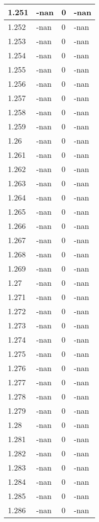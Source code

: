 \documentclass[a4paper,14pt]{extarticle}
\begin{document}
\begin{longtable}{||m{3cm}||m{3cm}|m{3cm}||m{3cm}||}
\hline
1.251 & -nan & 0 & -nan\\
\hline
1.252 & -nan & 0 & -nan\\
\hline
1.253 & -nan & 0 & -nan\\
\hline
1.254 & -nan & 0 & -nan\\
\hline
1.255 & -nan & 0 & -nan\\
\hline
1.256 & -nan & 0 & -nan\\
\hline
1.257 & -nan & 0 & -nan\\
\hline
1.258 & -nan & 0 & -nan\\
\hline
1.259 & -nan & 0 & -nan\\
\hline
1.26 & -nan & 0 & -nan\\
\hline
1.261 & -nan & 0 & -nan\\
\hline
1.262 & -nan & 0 & -nan\\
\hline
1.263 & -nan & 0 & -nan\\
\hline
1.264 & -nan & 0 & -nan\\
\hline
1.265 & -nan & 0 & -nan\\
\hline
1.266 & -nan & 0 & -nan\\
\hline
1.267 & -nan & 0 & -nan\\
\hline
1.268 & -nan & 0 & -nan\\
\hline
1.269 & -nan & 0 & -nan\\
\hline
1.27 & -nan & 0 & -nan\\
\hline
1.271 & -nan & 0 & -nan\\
\hline
1.272 & -nan & 0 & -nan\\
\hline
1.273 & -nan & 0 & -nan\\
\hline
1.274 & -nan & 0 & -nan\\
\hline
1.275 & -nan & 0 & -nan\\
\hline
1.276 & -nan & 0 & -nan\\
\hline
1.277 & -nan & 0 & -nan\\
\hline
1.278 & -nan & 0 & -nan\\
\hline
1.279 & -nan & 0 & -nan\\
\hline
1.28 & -nan & 0 & -nan\\
\hline
1.281 & -nan & 0 & -nan\\
\hline
1.282 & -nan & 0 & -nan\\
\hline
1.283 & -nan & 0 & -nan\\
\hline
1.284 & -nan & 0 & -nan\\
\hline
1.285 & -nan & 0 & -nan\\
\hline
1.286 & -nan & 0 & -nan\\

\end{longtable}
\end{document}
